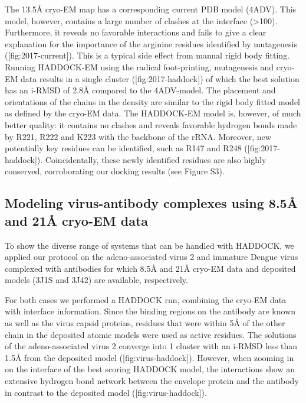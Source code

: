 The 13.5Å cryo-EM map has a corresponding current PDB model (4ADV). This model, however, contains a large number of clashes at the interface (>100). 
Furthermore, it reveals no favorable interactions and fails to give a clear explanation for the importance of the arginine residues identified by mutagenesis ([fig:2017-current]).
This is a typical side effect from manual rigid body fitting. 
Running HADDOCK-EM using the radical foot-printing, mutagenesis and cryo-EM data results in a single cluster ([fig:2017-haddock]) of which the best solution has an i-RMSD of 2.8Å compared to the 4ADV-model. 
The placement and orientations of the chains in the density are similar to the rigid body fitted model as defined by the cryo-EM data. 
The HADDOCK-EM model is, however, of much better quality: it contains no clashes and reveals favorable hydrogen bonds made by R221, R222 and K223 with the backbone of the rRNA. 
Moreover, new potentially key residues can be identified, such as R147 and R248 ([fig:2017-haddock]).
Coincidentally, these newly identified residues are also highly conserved, corroborating our docking results (see Figure S3).


\subsection{Modeling virus-antibody complexes using 8.5Å and 21Å cryo-EM data}

{}

To show the diverse range of systems that can be handled with HADDOCK, we applied our protocol on the adeno-associated virus 2 and immature Dengue virus complexed with antibodies for which 8.5Å and 21Å cryo-EM data and deposited models (3J1S and 3J42) are available, respectively.

For both cases we performed a HADDOCK run, combining the cryo-EM data with interface information. Since the binding regions on the antibody are known as well as the virus capsid proteins, residues that were within 5Å of the other chain in the deposited atomic models were used as active residues. 
The solutions of the adeno-associated virus 2 converge into 1 cluster with an i-RMSD less than 1.5Å from the deposited model ([fig:virus-haddock]). 
However, when zooming in on the interface of the best scoring HADDOCK model, the interactions show an extensive hydrogen bond network between the envelope protein and the antibody in contrast to the deposited model ([fig:virus-haddock]). 

